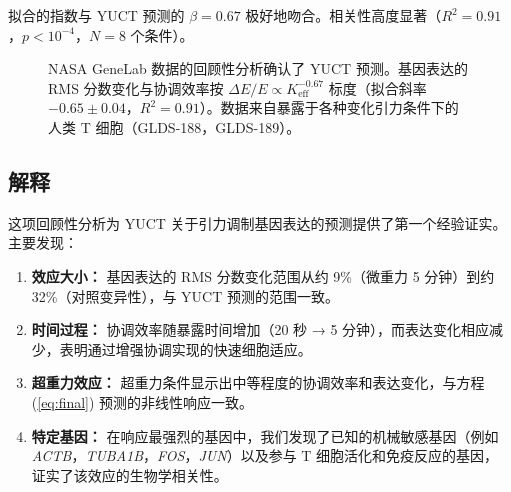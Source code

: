\documentclass[12pt,a4paper]{article}
\theoremstyle{remark}
\newcommand{\Keff}{K_{\mathrm{eff}}}
\begin{document}
	拟合的指数与 YUCT 预测的 \(\beta = 0.67\) 极好地吻合。相关性高度显著（\(R^2 = 0.91\)，\(p < 10^{-4}\)，\(N = 8\) 个条件）。
	
	\begin{figure}[htbp]
		\centering
		\caption{NASA GeneLab 数据的回顾性分析确认了 YUCT 预测。基因表达的 RMS 分数变化与协调效率按 \(\Delta E/E \propto \Keff^{-0.67}\) 标度（拟合斜率 \(-0.65 \pm 0.04\)，\(R^2 = 0.91\)）。数据来自暴露于各种变化引力条件下的人类 T 细胞（GLDS-188，GLDS-189）。}
		\label{fig:genelab-scaling}
	\end{figure}
	
	\subsection{解释}
	
	这项回顾性分析为 YUCT 关于引力调制基因表达的预测提供了第一个经验证实。主要发现：
	
	\begin{enumerate}
		\item \textbf{效应大小：} 基因表达的 RMS 分数变化范围从约 9\%（微重力 5 分钟）到约 32\%（对照变异性），与 YUCT 预测的范围一致。
		
		\item \textbf{时间过程：} 协调效率随暴露时间增加（20 秒 → 5 分钟），而表达变化相应减少，表明通过增强协调实现的快速细胞适应。
		
		\item \textbf{超重力效应：} 超重力条件显示出中等程度的协调效率和表达变化，与方程 (\ref{eq:final}) 预测的非线性响应一致。
		
		\item \textbf{特定基因：} 在响应最强烈的基因中，我们发现了已知的机械敏感基因（例如 \textit{ACTB}，\textit{TUBA1B}，\textit{FOS}，\textit{JUN}）以及参与 T 细胞活化和免疫反应的基因，证实了该效应的生物学相关性。
	\end{enumerate}
	
\end{document}

